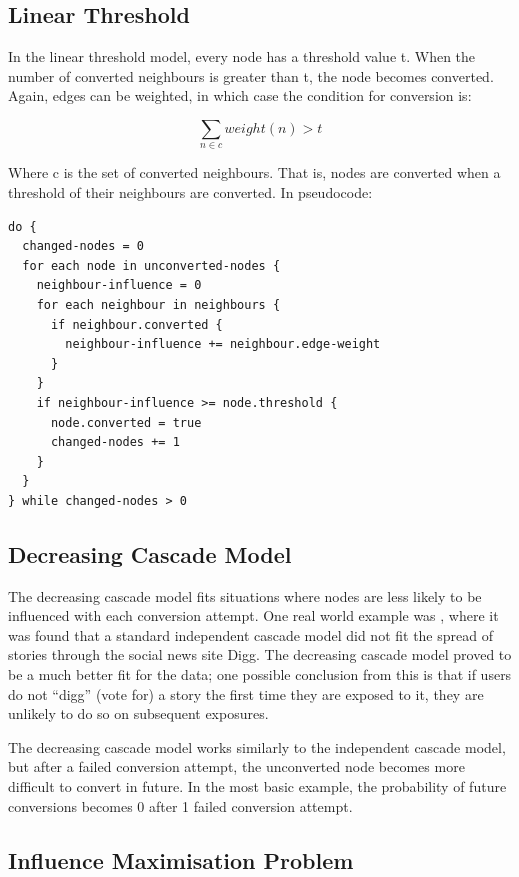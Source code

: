 \subsection{Linear Threshold}
 In the linear threshold model, every node has a threshold value t. When the number of converted neighbours is greater than t, the node becomes converted. Again, edges can be weighted, in which case the condition for conversion is:

\[
\sum_{n \in c}  weight(n) > t
\]

Where c is the set of converted neighbours. That is, nodes are converted when a threshold of their neighbours are converted. In pseudocode:

\begin{verbatim}
do {
  changed-nodes = 0
  for each node in unconverted-nodes {
    neighbour-influence = 0
    for each neighbour in neighbours {
      if neighbour.converted {
        neighbour-influence += neighbour.edge-weight
      }
    }
    if neighbour-influence >= node.threshold {
      node.converted = true
      changed-nodes += 1
    } 
  }
} while changed-nodes > 0
\end{verbatim}

\subsection{Decreasing Cascade Model}

The decreasing cascade model fits situations where nodes are less likely to be influenced with each conversion attempt. One real world example was \cite{digg}, where it was found that a standard independent cascade model did not fit the spread of stories through the social news site Digg. The decreasing cascade model proved to be a much better fit for the data; one possible conclusion from this is that if users do not ``digg'' (vote for) a story the first time they are exposed to it, they are unlikely to do so on subsequent exposures.

The decreasing cascade model works similarly to the independent cascade model, but after a failed conversion attempt, the unconverted node becomes more difficult to convert in future. In the most basic example, the probability of future conversions becomes 0 after 1 failed conversion attempt.

\subsection{Influence Maximisation Problem}

